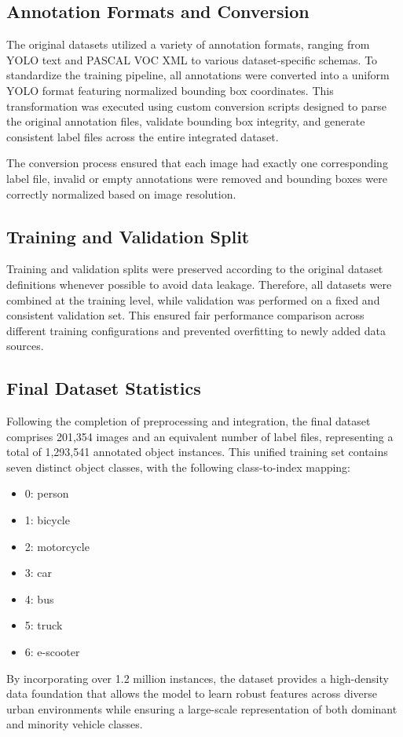 \documentclass[12pt,a4paper]{report}
\begin{document}
\subsection{Annotation Formats and Conversion}
The original datasets utilized a variety of annotation formats, ranging from YOLO text and PASCAL VOC XML to various dataset-specific schemas. To standardize the training pipeline, all annotations were converted into a uniform YOLO format featuring normalized bounding box coordinates. This transformation was executed using custom conversion scripts designed to parse the original annotation files, validate bounding box integrity, and generate consistent label files across the entire integrated dataset. 

The conversion process ensured that each image had exactly one corresponding label file, invalid or empty annotations were removed and bounding boxes were correctly normalized based on image resolution.

\subsection{Training and Validation Split}
Training and validation splits were preserved according to the original dataset definitions whenever possible to avoid data leakage.  Therefore, all datasets were combined at the training level, while validation was performed on a fixed and consistent validation set. This ensured fair performance comparison across different training configurations and prevented overfitting to newly added data sources.

\subsection{Final Dataset Statistics}
Following the completion of preprocessing and integration, the final dataset comprises 201,354 images and an equivalent number of label files, representing a total of 1,293,541 annotated object instances. This unified training set contains seven distinct object classes, with the following class-to-index mapping:

\begin{itemize}
    \item 0: person
    \item 1: bicycle
    \item 2: motorcycle
    \item 3: car
    \item 4: bus
    \item 5: truck
    \item 6: e-scooter
\end{itemize}
By incorporating over 1.2 million instances, the dataset provides a high-density data foundation that allows the model to learn robust features across diverse urban environments while ensuring a large-scale representation of both dominant and minority vehicle classes.
\end{document}
